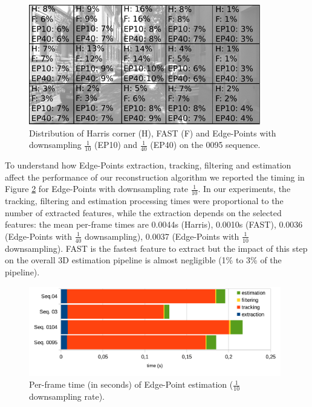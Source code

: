 \begin{figure}[t]
  \centering
  \includegraphics[width=0.9\textwidth]{././img/ch-incr-manif/distr}
  \caption{Distribution of Harris corner (H), FAST (F) and Edge-Points with downsampling $\frac{1}{10}$ (EP10) and $\frac{1}{40}$ (EP40) on the 0095 sequence.}
   \label{fig:distr}
\end{figure}


To understand how Edge-Points extraction, tracking, filtering and estimation affect the performance of our reconstruction algorithm we reported the timing in Figure \ref{tab:timing} for Edge-Points with downsampling rate $\frac{1}{10}$.
In our experiments, the tracking, filtering and estimation processing times were proportional to the number of extracted features, while the extraction depends on the selected features: the mean per-frame times are 0.0044s (Harris),  0.0010s (FAST),  0.0036 (Edge-Points with $\frac{1}{40}$ downsampling),  0.0037 (Edge-Points with $\frac{1}{10}$ downsampling). FAST is the fastest feature to extract but the impact of this step on the overall 3D estimation pipeline is almost negligible (1\% to 3\% of the pipeline).


 \begin{figure}[t]
  \centering
  \includegraphics[width=0.98\textwidth]{././img//risultatitiming.pdf}
  \caption{Per-frame time (in seconds) of Edge-Point estimation ($\frac{1}{10}$ downsampling rate).}
   \label{tab:timing}
\end{figure}
%
  
